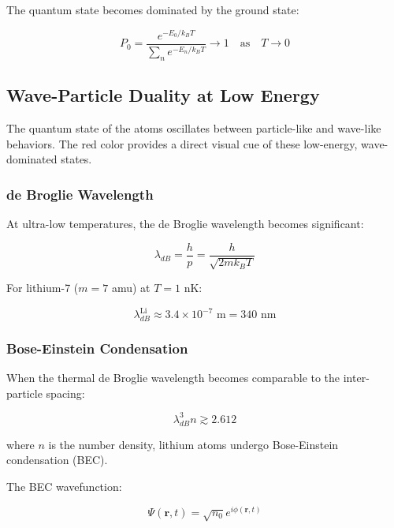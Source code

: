 The quantum state becomes dominated by the ground state:

\begin{equation}
\label{eq:ground_state_occupation}
P_0 = \frac{e^{-E_0/k_B T}}{\sum_n e^{-E_n/k_B T}} \to 1 \quad \text{as} \quad T \to 0
\end{equation}

\subsection{Wave-Particle Duality at Low Energy}

The quantum state of the atoms oscillates between particle-like and wave-like behaviors. The red color provides a direct visual cue of these low-energy, wave-dominated states.

\subsubsection{de Broglie Wavelength}

At ultra-low temperatures, the de Broglie wavelength becomes significant:

\begin{equation}
\label{eq:debroglie_wavelength}
\lambda_{dB} = \frac{h}{p} = \frac{h}{\sqrt{2m k_B T}}
\end{equation}

For lithium-7 ($m = 7$ amu) at $T = 1$ nK:

\begin{equation}
\label{eq:lithium_wavelength}
\lambda_{dB}^{\text{Li}} \approx 3.4 \times 10^{-7} \text{ m} = 340 \text{ nm}
\end{equation}

\subsubsection{Bose-Einstein Condensation}

When the thermal de Broglie wavelength becomes comparable to the inter-particle spacing:

\begin{equation}
\label{eq:bec_condition}
\lambda_{dB}^3 n \gtrsim 2.612
\end{equation}

where $n$ is the number density, lithium atoms undergo Bose-Einstein condensation (BEC).

The BEC wavefunction:

\begin{equation}
\label{eq:bec_wavefunction}
\Psi(\mathbf{r}, t) = \sqrt{n_0} e^{i\phi(\mathbf{r},t)}
\end{equation}

